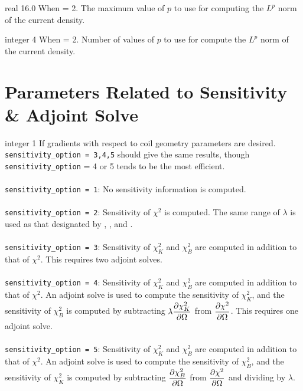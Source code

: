 \myhrule

{real}
{16.0}
{When  = 2.}
{
The maximum value of $p$ to use for computing the $L^p$ norm of the current density.
}

\myhrule

{integer}
{4}
{When  = 2.}
{
Number of values of $p$ to use for compute the $L^p$ norm of the current density. 
}

\myhrule

\section{Parameters Related to Sensitivity \& Adjoint Solve}

\myhrule

{integer}
{1}
{If gradients with respect to coil geometry parameters are desired.}
{\\ \texttt{sensitivity\_option = 3,4,5} should give the same results, though \texttt{sensitivity\_option} = 4 or 5 tends to be the most efficient. \\ \\
\texttt{sensitivity\_option = 1}: No sensitivity information is computed. \\ \\
\texttt{sensitivity\_option = 2}: Sensitivity of $\chi^2$ is computed. The same range of $\lambda$ is used as that designated by , , and . \\ \\
\texttt{sensitivity\_option = 3}: Sensitivity of $\chi^2_K$ and $\chi^2_B$ are computed in addition to that of $\chi^2$. This requires two adjoint solves. \\ \\
\texttt{sensitivity\_option = 4}: Sensitivity of $\chi^2_K$ and $\chi^2_B$ are computed in addition to that of $\chi^2$. An adjoint solve is used to compute the sensitivity of $\chi^2_K$, and the sensitivity of $\chi^2_B$ is computed by subtracting $\lambda \dfrac{\partial \chi^2_K}{\partial \Omega}$ from $\dfrac{\partial \chi^2}{\partial \Omega}$. This requires one adjoint solve. \\ \\
\texttt{sensitivity\_option = 5}: Sensitivity of $\chi^2_K$ and $\chi^2_B$ are computed in addition to that of $\chi^2$. An adjoint solve is used to compute the sensitivity of $\chi^2_B$, and the sensitivity of $\chi^2_K$ is computed by subtracting $\dfrac{\partial \chi^2_B}{\partial \Omega}$ from $\dfrac{\partial \chi^2}{\partial \Omega}$ and dividing by $\lambda$. 
}

